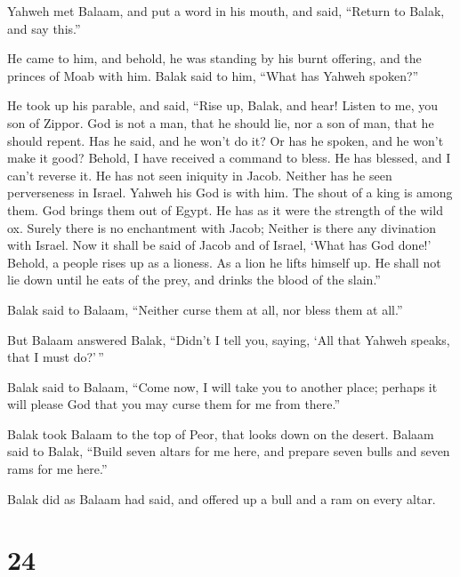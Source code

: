  Yahweh met Balaam, and put a word in his mouth, and
said, ``Return to Balak, and say this.''

 He came to him, and behold, he was standing by his burnt
offering, and the princes of Moab with him. Balak said to him, ``What
has Yahweh spoken?''

 He took up his parable, and said, ``Rise up, Balak, and
hear! Listen to me, you son of Zippor.  God is not a man,
that he should lie, nor a son of man, that he should repent. Has he
said, and he won't do it? Or has he spoken, and he won't make it good?
 Behold, I have received a command to bless. He has
blessed, and I can't reverse it.  He has not seen
iniquity in Jacob. Neither has he seen perverseness in Israel. Yahweh
his God is with him. The shout of a king is among them. 
God brings them out of Egypt. He has as it were the strength of the wild
ox.  Surely there is no enchantment with Jacob; Neither
is there any divination with Israel. Now it shall be said of Jacob and
of Israel, `What has God done!'  Behold, a people rises
up as a lioness. As a lion he lifts himself up. He shall not lie down
until he eats of the prey, and drinks the blood of the slain.''

 Balak said to Balaam, ``Neither curse them at all, nor
bless them at all.''

 But Balaam answered Balak, ``Didn't I tell you, saying,
`All that Yahweh speaks, that I must do?'\,''

 Balak said to Balaam, ``Come now, I will take you to
another place; perhaps it will please God that you may curse them for me
from there.''

 Balak took Balaam to the top of Peor, that looks down on
the desert.  Balaam said to Balak, ``Build seven altars
for me here, and prepare seven bulls and seven rams for me here.''

 Balak did as Balaam had said, and offered up a bull and
a ram on every altar.

\hypertarget{section-23}{%
\section{24}\label{section-23}}

